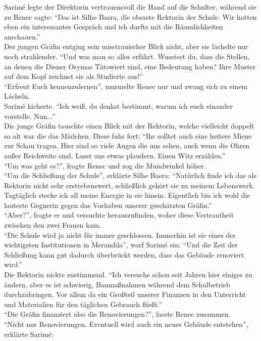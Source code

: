 Sarimé legte der Direktorin vertrauensvoll die Hand auf die Schulter, während sie zu Renec sagte: 
``Das ist Silhe Basra, die oberste Rektorin der Schule. Wir hatten eben ein interessantes Gespräch 
und ich durfte mit die Räumlichkeiten anschauen.''\\
Der jungen Gräfin entging sein misstrauischer Blick nicht, aber sie lächelte nur noch strahlender. 
``Und was man so alles erfährt. Wusstest du, dass die Stellen, an denen die Diener Osymas 
Tätowiert sind, eine Bedeutung haben? Ihre Muster auf dem Kopf zeichnet sie als Studierte aus!''\\
``Erfreut Euch kennenzulernen'', murmelte Renec nur und zwang sich zu einem Lächeln.\\
Sarimé kicherte. ``Ich weiß, du denkst bestimmt, warum ich euch einander vorstelle. Nun...''\\
Die junge Gräfin tauschte einen Blick mit der Rektorin, welche vielleicht doppelt so alt war die 
das Mädchen. Diese fuhr fort: ``Ihr solltet auch eine heitere Miene zur Schau tragen. Hier sind so 
viele Augen die uns sehen, auch wenn die Ohren außer Reichweite sind. Lasst uns etwas plaudern. 
Einen Witz erzählen.''\\
``Um was geht es?'', fragte Renec und zog die Mundwinkel höher.\\
``Um die Schließung der Schule'', erklärte Silhe Basra: ``Natürlich finde ich das als Rektorin 
nicht sehr erstrebenswert, schließlich gehört sie zu meinem Lebenswerk. Tagtäglich stecke ich all 
meine Energie in sie hinein. Eigentlich bin ich wohl die lauteste Gegnerin gegen das Vorhaben 
unserer geschätzten Gräfin.''\\
``Aber?'', fragte er und versuchte herauszufinden, woher diese Vertrautheit zwischen den zwei 
Frauen kam.\\
``Die Schule wird ja nicht für immer geschlossen. Immerhin ist sie eines der wichtigsten 
Institutionen in Merandila'', warf Sarimé ein: ``Und die Zeit der Schließung kann gut dadurch 
überbrückt werden, dass das Gebäude renoviert wird.''\\
Die Rektorin nickte zustimmend. ``Ich versuche schon seit Jahren hier einiges zu ändern, aber es 
ist schwierig, Baumaßnahmen während dem Schulbetrieb durchzubringen. Vor allem da ein Großteil 
unserer Finanzen in den Unterricht und Materialien für den täglichen Gebrauch fließt.''\\
``Die Gräfin finanziert also die Renovierungen?'', fasste Renec zusammen.\\
``Nicht nur Renovierungen. Eventuell wird auch ein neues Gebäude entstehen'', erklärte Sarimé: 
